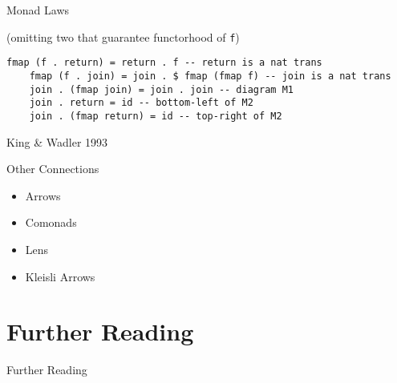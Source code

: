 \documentclass[10pt]{beamer}
\theoremstyle{definition}
\theoremstyle{remark}
\numberwithin{equation}{section}
\begin{document}
\begin{frame}[fragile]{Monad Laws}

  (omitting two that guarantee functorhood of \lstinline{f})
  
  \begin{lstlisting}[frame=single]
    fmap (f . return) = return . f -- return is a nat trans
    fmap (f . join) = join . $ fmap (fmap f) -- join is a nat trans
    join . (fmap join) = join . join -- diagram M1
    join . return = id -- bottom-left of M2
    join . (fmap return) = id -- top-right of M2
  \end{lstlisting}

  {\small King \& Wadler 1993}
  
\end{frame}

\begin{frame}[fragile]{Other Connections}
  \begin{center}
    \begin{itemize}
    \item Arrows 
    \item Comonads
    \item Lens
    \item Kleisli Arrows
    \end{itemize}
  \end{center}
\end{frame}

\section{Further Reading}

\begin{frame}[fragile]{Further Reading}

  \nocite{elkins_calculating_2009}
  \nocite{diel:blog}
  \nocite{milewski2014}

  
  

\end{frame}
\end{document}
